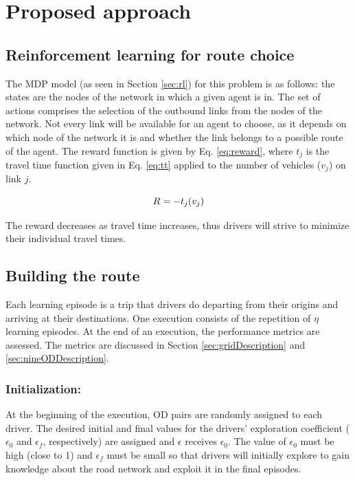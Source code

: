 \documentclass{RITA}
\newcommand{\travTime}{\ensuremath{t_j}} 	%
\newcommand{\veh}{\ensuremath{v}}		%
\newcommand{\reward}[1][]{\ensuremath{R_#1}}	%
\newcommand{\numepis}{\ensuremath{\eta}}	%
\begin{document}
\section{Proposed approach}
\label{sec:proposal}

\subsection{Reinforcement learning for route choice}

The MDP model (as seen in Section \ref{sec:rl}) for this problem is as follows: the states are the nodes of the  network in which a given agent is in. The set of actions comprises the selection of the outbound links from the nodes of the network. Not every link will be available for an agent to choose, as it depends on which node of the network it is and whether the link belongs to a possible route of the agent. The reward function is given by Eq. \eqref{eq:reward}, where $\travTime$ is the travel time function given in Eq. \eqref{eq:tt} applied to the number of vehicles ($\veh_j$) on link $j$.

\begin{equation}
\label{eq:reward}
\reward{} = - \travTime(\veh_j)
\end{equation}

The reward decreases as travel time increases, thus drivers will strive to minimize their individual travel times.

\subsection{Building the route}

Each learning episode is a trip that drivers do departing from their origins and arriving at their destinations. One execution consists of the repetition of $\numepis$ learning episodes. At the end of an execution, the performance metrics are assessed. The metrics are discussed in Section \ref{sec:gridDescription} and \ref{sec:nineODDescription}.

\subsubsection{Initialization:}
At the beginning of the execution, OD pairs are randomly assigned to each driver. The desired initial and final values for the drivers' exploration coefficient ($\epsilon_0$ and $\epsilon_f$, respectively) are assigned and $\epsilon$ receives $\epsilon_0$. The value of $\epsilon_0$ must be high (close to 1) and $\epsilon_f$ must be small so that drivers will initially explore to gain knowledge about the road network and exploit it in the final episodes.
\end{document}
